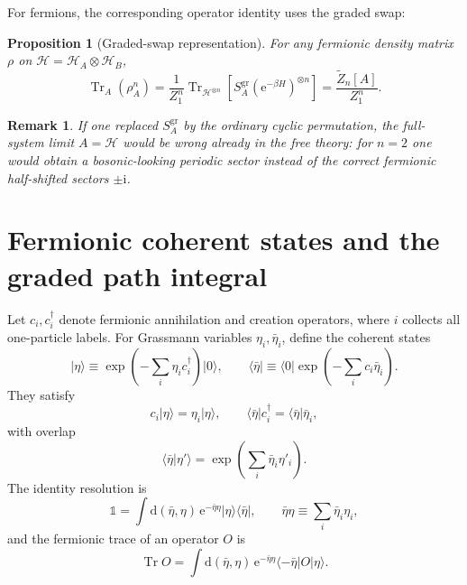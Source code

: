 \documentclass[11pt]{article}
\newtheorem{proposition}{Proposition}
\newtheorem{remark}{Remark}
\newcommand{\Tr}{\operatorname{Tr}}
\newcommand{\e}{\mathrm{e}}
\newcommand{\ii}{\mathrm{i}}
\newcommand{\dd}{\mathrm{d}}
\newcommand{\1}{\mathds{1}}
\newcommand{\HA}{\mathcal{H}_A}
\newcommand{\HB}{\mathcal{H}_B}
\newcommand{\HH}{\mathcal{H}}
\newcommand{\br}[1]{\left(#1\right)}
\newcommand{\sq}[1]{\left[#1\right]}
\begin{document}
For fermions, the corresponding operator identity uses the graded swap:
\begin{proposition}[Graded-swap representation]
For any fermionic density matrix $\rho$ on $\HH=\HA\otimes \HB$,
\begin{equation}
\Tr_A(\rho_A^n)
=
\frac{1}{Z_1^n}
\Tr_{\HH^{\otimes n}}
\sq{
S_A^{\mathrm{gr}}
\br{\e^{-\beta H}}^{\otimes n}
}
=
\frac{\widetilde Z_n[A]}{Z_1^n}.
\label{eq:graded-swap-identity}
\end{equation}
\end{proposition}

\begin{remark}
If one replaced $S_A^{\mathrm{gr}}$ by the ordinary cyclic permutation, the
full-system limit $A=\HH$ would be wrong already in the free theory: for
$n=2$ one would obtain a bosonic-looking periodic sector instead of the
correct fermionic half-shifted sectors $\pm \ii$.
\end{remark}

\section{Fermionic coherent states and the graded path integral}

Let $c_i,c_i^\dagger$ denote fermionic annihilation and creation operators,
where $i$ collects all one-particle labels. For Grassmann variables
$\eta_i,\bar\eta_i$, define the coherent states
\begin{equation}
\lvert \eta\rangle
\equiv
\exp\br{-\sum_i \eta_i c_i^\dagger}\lvert 0\rangle,
\qquad
\langle \bar\eta\rvert
\equiv
\langle 0\rvert \exp\br{-\sum_i c_i \bar\eta_i}.
\label{eq:coherent-state-def}
\end{equation}
They satisfy
\begin{equation}
c_i\lvert\eta\rangle=\eta_i\lvert\eta\rangle,
\qquad
\langle\bar\eta\rvert c_i^\dagger=\langle\bar\eta\rvert \bar\eta_i,
\label{eq:coherent-eigen}
\end{equation}
with overlap
\begin{equation}
\langle \bar\eta\vert \eta'\rangle
=
\exp\br{\sum_i \bar\eta_i \eta'_i}.
\label{eq:coherent-overlap}
\end{equation}
The identity resolution is
\begin{equation}
\1
=
\int \dd(\bar\eta,\eta)\,
\e^{-\bar\eta\eta}
\lvert \eta\rangle\langle \bar\eta\rvert,
\qquad
\bar\eta\eta\equiv \sum_i \bar\eta_i\eta_i,
\label{eq:coherent-identity}
\end{equation}
and the fermionic trace of an operator $O$ is
\begin{equation}
\Tr O
=
\int \dd(\bar\eta,\eta)\,
\e^{-\bar\eta\eta}
\langle -\bar\eta\rvert O\rvert \eta\rangle.
\label{eq:trace-formula}
\end{equation}
\end{document}
